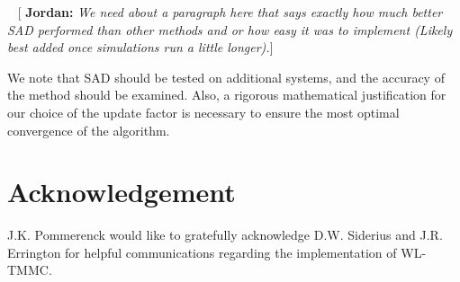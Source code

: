 \documentclass[letterpaper,twocolumn,amsmath,amssymb,pre,aps,10pt]{revtex4-1}
\newcommand{\blue}[1]{{\bf \color{blue} #1}}
\newcommand{\jpsays}[1]{{\color{red} [\blue{Jordan:} \emph{#1}]}}
\begin{document}
~\jpsays{We need about a paragraph here that says exactly how much
better SAD performed than other methods and or how easy it was to
implement (Likely best added once simulations run a little longer).}

We note that SAD should be tested on additional systems, and the
accuracy of the method should be examined.  Also, a rigorous
mathematical justification for our choice of the update factor is
necessary to ensure the most optimal convergence of the algorithm.

\section{Acknowledgement}

J.K. Pommerenck would like to gratefully acknowledge D.W. Siderius and
J.R. Errington for helpful communications regarding the implementation
of WL-TMMC.



\end{document}
